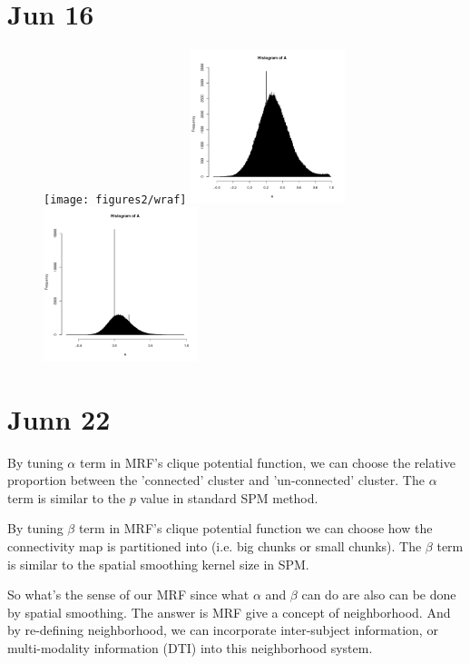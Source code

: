\documentclass[12pt]{article}
\begin{document}
\section{Jun 16}
\begin{figure}
\texttt{[image: figures2/wraf]}
\includegraphics[width = 0.4\textwidth]{figures2/swarf}\\
\includegraphics[width = 0.4\textwidth]{figures2/3mm_preprocessed}
\end{figure}

\section{Junn 22}
By tuning $\alpha$ term in MRF's clique potential function, we can choose the relative proportion between the 'connected' cluster and 'un-connected' cluster. The $\alpha$ term is similar to the $p$ value in standard SPM method. 

By tuning $\beta$ term in MRF's clique potential function we can choose how the connectivity map is partitioned into (i.e. big chunks or small chunks). The $\beta$ term is similar to the spatial smoothing kernel size in SPM.

So what's the sense of our MRF since what $\alpha$ and $\beta$ can do are also can be done by spatial smoothing. The answer is MRF give a concept of neighborhood. And by re-defining neighborhood, we can incorporate inter-subject information, or multi-modality information (DTI) into this neighborhood system. 
\end{document}
